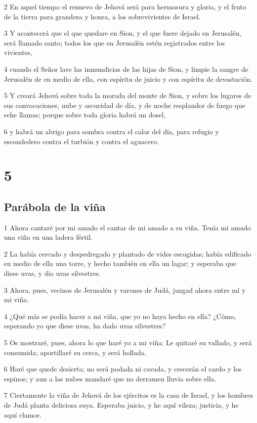 \par 2 En aquel tiempo el renuevo de Jehová será para hermosura y gloria, y el fruto de la tierra para grandeza y honra, a los sobrevivientes de Israel.
\par 3 Y acontecerá que el que quedare en Sion, y el que fuere dejado en Jerusalén, será llamado santo; todos los que en Jerusalén estén registrados entre los vivientes,
\par 4 cuando el Señor lave las inmundicias de las hijas de Sion, y limpie la sangre de Jerusalén de en medio de ella, con espíritu de juicio y con espíritu de devastación.
\par 5 Y creará Jehová sobre toda la morada del monte de Sion, y sobre los lugares de sus convocaciones, nube y oscuridad de día, y de noche resplandor de fuego que eche llamas; porque sobre toda gloria habrá un dosel,
\par 6 y habrá un abrigo para sombra contra el calor del día, para refugio y escondedero contra el turbión y contra el aguacero.

\chapter{5}

\section*{Parábola de la viña}

\par 1 Ahora cantaré por mi amado el cantar de mi amado a su viña. Tenía mi amado una viña en una ladera fértil.
\par 2 La había cercado y despedregado y plantado de vides escogidas; había edificado en medio de ella una torre, y hecho también en ella un lagar; y esperaba que diese uvas, y dio uvas silvestres.
\par 3 Ahora, pues, vecinos de Jerusalén y varones de Judá, juzgad ahora entre mí y mi viña.
\par 4 ¿Qué más se podía hacer a mi viña, que yo no haya hecho en ella? ¿Cómo, esperando yo que diese uvas, ha dado uvas silvestres?
\par 5 Os mostraré, pues, ahora lo que haré yo a mi viña: Le quitaré su vallado, y será consumida; aportillaré su cerca, y será hollada.
\par 6 Haré que quede desierta; no será podada ni cavada, y crecerán el cardo y los espinos; y aun a las nubes mandaré que no derramen lluvia sobre ella.
\par 7 Ciertamente la viña de Jehová de los ejércitos es la casa de Israel, y los hombres de Judá planta deliciosa suya. Esperaba juicio, y he aquí vileza; justicia, y he aquí clamor.

